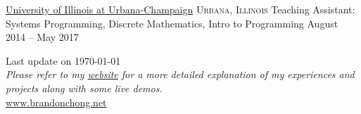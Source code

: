 \documentclass[10pt,letterpaper]{article}
\begin{document}
\headedsection
  {\href{http://www.illinois.edu/}{University of Illinois at Urbana-Champaign}}
  {\textsc{Urbana, Illinois}}{
    \headedsubsection
      {Teaching Assistant: Systems Programming, Discrete Mathematics, Intro to Programming}
      {August 2014 -- May 2017}
      {}
  }

\spacedhrule{0.5em}{-0.4em}

\vspace{-0.2em}
\begin{center}
  Last update on \today\\
  \emph{\small Please refer to my \href{http://www.brandonchong.net}{website} for a more detailed explanation of my experiences and projects along with some live demos.}\\
  \href{http://www.brandonchong.net}{www.brandonchong.net}
\end{center}

\end{document}
